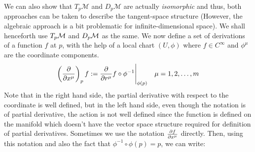 We can also show that $T_p\mathcal{M}$ and $D_p\mathcal{M}$ are actually \textit{isomorphic} and thus, both approaches can be taken to describe the tangent-space structure (However, the algebraic approach is a bit problematic for infinite-dimensional space). We shall henceforth use $T_p\mathcal M$ and $D_p\mathcal M$ as the same.
We now define a set of derivations of a function $f$ at $p$, with the help of a local chart $(U,\phi)$ where $f\in C^\infty$ and $\phi^\mu$ are the coordinate components.
$$\left( \pdv{x^\mu} \right)_p f := \pdv{r^\mu}f\circ \phi^{-1}\Bigg|_{\phi(p)}\quad \mu = 1,2,\ldots, m$$
Note that in the right hand side, the partial derivative with respect to the coordinate is well defined, but in the left hand side, even though the notation is of partial derivative, the action is not well defined since the function is defined on the manifold which doesn't have the vector space structure required for definition of partial derivatives. Sometimes we use the notation $\pdv{f}{x^\mu}$ directly. Then, using this notation and also the fact that $\phi^{-1}\circ \phi(p) = p$, we can write:

